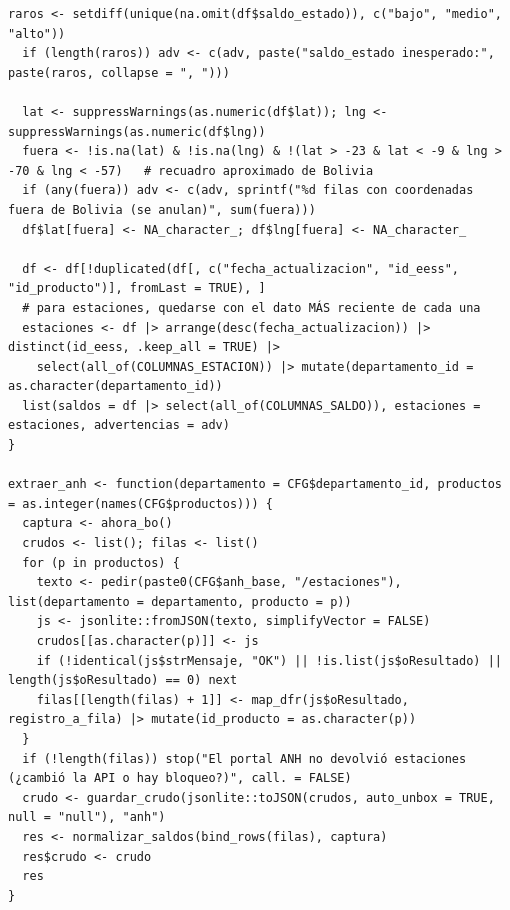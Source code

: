 \begin{lstlisting}[style=anexoR]
  raros <- setdiff(unique(na.omit(df$saldo_estado)), c("bajo", "medio", "alto"))
  if (length(raros)) adv <- c(adv, paste("saldo_estado inesperado:", paste(raros, collapse = ", ")))

  lat <- suppressWarnings(as.numeric(df$lat)); lng <- suppressWarnings(as.numeric(df$lng))
  fuera <- !is.na(lat) & !is.na(lng) & !(lat > -23 & lat < -9 & lng > -70 & lng < -57)   # recuadro aproximado de Bolivia
  if (any(fuera)) adv <- c(adv, sprintf("%d filas con coordenadas fuera de Bolivia (se anulan)", sum(fuera)))
  df$lat[fuera] <- NA_character_; df$lng[fuera] <- NA_character_

  df <- df[!duplicated(df[, c("fecha_actualizacion", "id_eess", "id_producto")], fromLast = TRUE), ]
  # para estaciones, quedarse con el dato MÁS reciente de cada una
  estaciones <- df |> arrange(desc(fecha_actualizacion)) |> distinct(id_eess, .keep_all = TRUE) |>
    select(all_of(COLUMNAS_ESTACION)) |> mutate(departamento_id = as.character(departamento_id))
  list(saldos = df |> select(all_of(COLUMNAS_SALDO)), estaciones = estaciones, advertencias = adv)
}

extraer_anh <- function(departamento = CFG$departamento_id, productos = as.integer(names(CFG$productos))) {
  captura <- ahora_bo()
  crudos <- list(); filas <- list()
  for (p in productos) {
    texto <- pedir(paste0(CFG$anh_base, "/estaciones"), list(departamento = departamento, producto = p))
    js <- jsonlite::fromJSON(texto, simplifyVector = FALSE)
    crudos[[as.character(p)]] <- js
    if (!identical(js$strMensaje, "OK") || !is.list(js$oResultado) || length(js$oResultado) == 0) next
    filas[[length(filas) + 1]] <- map_dfr(js$oResultado, registro_a_fila) |> mutate(id_producto = as.character(p))
  }
  if (!length(filas)) stop("El portal ANH no devolvió estaciones (¿cambió la API o hay bloqueo?)", call. = FALSE)
  crudo <- guardar_crudo(jsonlite::toJSON(crudos, auto_unbox = TRUE, null = "null"), "anh")
  res <- normalizar_saldos(bind_rows(filas), captura)
  res$crudo <- crudo
  res
}
\end{lstlisting}

